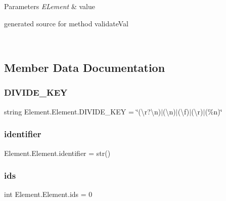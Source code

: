 \begin{DoxyParams}{Parameters}
{\em E\+Lement} & value\begin{DoxyVerb}generated source for method validateVal \end{DoxyVerb}
 \\
\hline
\end{DoxyParams}


\subsection{Member Data Documentation}
\hypertarget{class_element_1_1_element_ae06a0f0ca0e5499c532f2550cf1ffea6}{}\label{class_element_1_1_element_ae06a0f0ca0e5499c532f2550cf1ffea6} 
\subsubsection{\texorpdfstring{D\+I\+V\+I\+D\+E\+\_\+\+K\+EY}{DIVIDE\_KEY}}
{\footnotesize\ttfamily string Element.\+Element.\+D\+I\+V\+I\+D\+E\+\_\+\+K\+EY = \char`\"{}(\textbackslash{}r?\textbackslash{}n)$\vert$(\textbackslash{}n)$\vert$(\textbackslash{}f)$\vert$(\textbackslash{}r)$\vert$(\%n)\char`\"{}\hspace{0.3cm}{\ttfamily [static]}}

\hypertarget{class_element_1_1_element_a2202a62a079908d52afc0b7796be2981}{}\label{class_element_1_1_element_a2202a62a079908d52afc0b7796be2981} 
\subsubsection{\texorpdfstring{identifier}{identifier}}
{\footnotesize\ttfamily Element.\+Element.\+identifier = str()\hspace{0.3cm}{\ttfamily [static]}}

\hypertarget{class_element_1_1_element_a219a21d962bfef58ad39c9762876588f}{}\label{class_element_1_1_element_a219a21d962bfef58ad39c9762876588f} 
\subsubsection{\texorpdfstring{ids}{ids}}
{\footnotesize\ttfamily int Element.\+Element.\+ids = 0\hspace{0.3cm}{\ttfamily [static]}}

